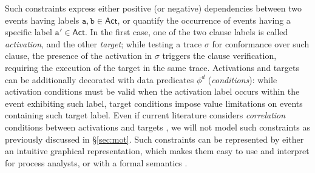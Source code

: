  Such constraints express either positive (or negative) dependencies between two events having labels $\texttt{a},\texttt{b}\in\textsf{Act}$, or quantify the occurrence of events having a specific label $\texttt{a}'\in\textsf{Act}$. In the first case, one of the two clause labels is called \textit{activation}, and the other \textit{target}; while testing a trace $\sigma$ for conformance over such clause, the presence of the activation in $\sigma$ triggers the clause verification, requiring the execution of the target in the same trace. Activations and targets can be additionally decorated with  data predicates $\phi^d$ (\textit{conditions}): while activation conditions must be valid when the activation label occurs within the event exhibiting such label, target conditions impose value limitations on events containing such target label. Even if current literature  considers \textit{correlation} conditions between activations and targets \cite{SchonigCMM16}, we will not model such constraints as previously discussed in \S\ref{sec:mot}. Such constraints can be represented by either an intuitive graphical representation, which makes them easy to use and interpret for process analysts, or with a formal semantics \cite{LeoniMA12}.

